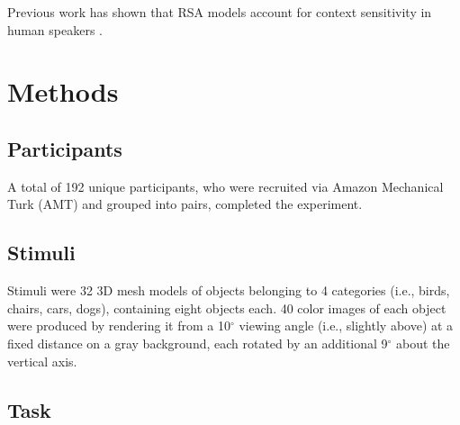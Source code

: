 \documentclass[9pt,twocolumn,twoside]{pnas-new}
\begin{document}

Previous work has shown that RSA models account for context sensitivity in human speakers \cite[]{GrafEtAl16_BasicLevel}. 


\section*{Methods}

\subsection*{Participants}

A total of 192 unique participants, who were recruited via Amazon Mechanical Turk (AMT) and grouped into pairs, completed the experiment. 

\subsection*{Stimuli}

Stimuli were 32 3D mesh models of objects belonging to 4 categories (i.e., birds, chairs, cars, dogs), containing eight objects each. 40 color images of each object were produced by rendering it from a 10$^{\circ}$ viewing angle (i.e., slightly above) at a fixed distance on a gray background, each rotated by an additional 9$^{\circ}$ about the vertical axis. 

\subsection*{Task}
\end{document}
